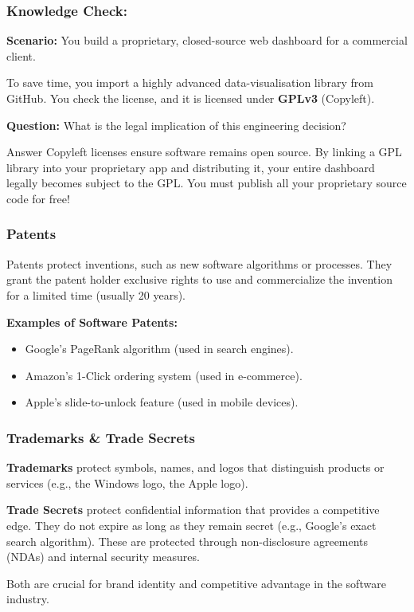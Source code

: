 \documentclass[xcolor=table]{beamer}
\begin{document}
\begin{frame}
    \frametitle{Knowledge Check:}
    \textbf{Scenario:} 
    You build a proprietary, closed-source web dashboard for a commercial client. 
    
    To save time, you import a highly advanced data-visualisation library from GitHub. You check the license, and it is licensed under \textbf{GPLv3} (Copyleft).
    
    \vspace{0.3cm}
    \textbf{Question:} What is the legal implication of this engineering decision?
    
    \pause
    \vspace{0.2cm}
    \begin{alertblock}{Answer}
        Copyleft licenses ensure software remains open source. By linking a GPL library into your proprietary app and distributing it, your entire dashboard legally becomes subject to the GPL. You must publish all your proprietary source code for free!
    \end{alertblock}
\end{frame}

\begin{frame}
    \frametitle{Patents}
    \small
    Patents protect inventions, such as new software algorithms or processes. They grant the patent holder exclusive rights to use and commercialize the invention for a limited time (usually 20 years).

    \vspace{0.2cm}
    \textbf{Examples of Software Patents:}
    \begin{itemize}
        \item Google's PageRank algorithm (used in search engines).
        \item Amazon's 1-Click ordering system (used in e-commerce).
        \item Apple's slide-to-unlock feature (used in mobile devices).
    \end{itemize}
\end{frame}

\begin{frame}
    \frametitle{Trademarks \& Trade Secrets}
    \small
    \textbf{Trademarks} protect symbols, names, and logos that distinguish products or services (e.g., the Windows logo, the Apple logo).
    
    \vspace{0.2cm}
    \textbf{Trade Secrets} protect confidential information that provides a competitive edge. They do not expire as long as they remain secret (e.g., Google's exact search algorithm). These are protected through non-disclosure agreements (NDAs) and internal security measures.
    
    \vspace{0.2cm}
    Both are crucial for brand identity and competitive advantage in the software industry.

\end{frame}
\end{document}
